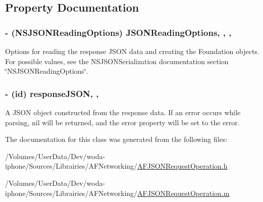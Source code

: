 \subsection{Property Documentation}
\hypertarget{interface_a_f_j_s_o_n_request_operation_a18f86ed904ccb70223a950ae5449a45b}{
\subsubsection[{J\-S\-O\-N\-Reading\-Options}]{\setlength{\rightskip}{0pt plus 5cm}-\/ (N\-S\-J\-S\-O\-N\-Reading\-Options) J\-S\-O\-N\-Reading\-Options\hspace{0.3cm}{\ttfamily [read]}, {\ttfamily [write]}, {\ttfamily [nonatomic]}, {\ttfamily [assign]}}}\label{interface_a_f_j_s_o_n_request_operation_a18f86ed904ccb70223a950ae5449a45b}
Options for reading the response J\-S\-O\-N data and creating the Foundation objects. For possible values, see the {\ttfamily N\-S\-J\-S\-O\-N\-Serialization} documentation section \char`\"{}\-N\-S\-J\-S\-O\-N\-Reading\-Options\char`\"{}. \hypertarget{interface_a_f_j_s_o_n_request_operation_a1bc9c9b08f780373ace7eb34b1ae8149}{
\subsubsection[{response\-J\-S\-O\-N}]{\setlength{\rightskip}{0pt plus 5cm}-\/ (id) response\-J\-S\-O\-N\hspace{0.3cm}{\ttfamily [read]}, {\ttfamily [nonatomic]}, {\ttfamily [strong]}}}\label{interface_a_f_j_s_o_n_request_operation_a1bc9c9b08f780373ace7eb34b1ae8149}
A J\-S\-O\-N object constructed from the response data. If an error occurs while parsing, {\ttfamily nil} will be returned, and the {\ttfamily error} property will be set to the error. 

The documentation for this class was generated from the following files\-:\begin{DoxyCompactItemize}
\item 
/\-Volumes/\-User\-Data/\-Dev/woda-\/iphone/\-Sources/\-Librairies/\-A\-F\-Networking/\hyperlink{_a_f_j_s_o_n_request_operation_8h}{A\-F\-J\-S\-O\-N\-Request\-Operation.\-h}\item 
/\-Volumes/\-User\-Data/\-Dev/woda-\/iphone/\-Sources/\-Librairies/\-A\-F\-Networking/\hyperlink{_a_f_j_s_o_n_request_operation_8m}{A\-F\-J\-S\-O\-N\-Request\-Operation.\-m}\end{DoxyCompactItemize}
